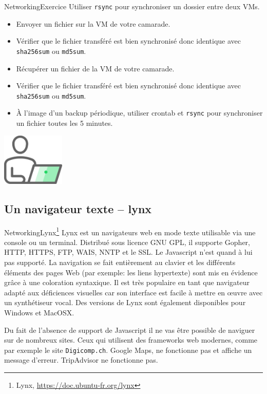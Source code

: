 \documentclass{beamer}
\begin{document}
    \begin{frame}{Networking}{Exercice \execcounterdispinc}
        Utiliser \lstinline{rsync} pour synchroniser un dossier entre deux VMs.
        \begin{itemize}
            \item Envoyer un fichier sur la VM de votre camarade.
            \item Vérifier que le fichier transféré est bien synchronisé donc identique avec \lstinline{sha256sum} ou \lstinline{md5sum}.
            \item Récupérer un fichier de la VM de votre camarade.
            \item Vérifier que le fichier transféré est bien synchronisé donc identique avec \lstinline{sha256sum} ou \lstinline{md5sum}.
            \item À l'image d'un backup périodique, utiliser crontab et \lstinline{rsync} pour synchroniser un fichier toutes les 5 minutes.
        \end{itemize}
        \begin{center}
            \includegraphics[width=3cm]{image/guy-in-front-of-desktop}
        \end{center}
    \end{frame}

    \subsection{Un navigateur texte – lynx}\label{subsec:lynx}

    \begin{frame}{Networking}{Lynx\footnote{Lynx, \url{https://doc.ubuntu-fr.org/lynx}}}
        Lynx est un navigateurs web en mode texte utilisable via une console ou un terminal.
        Distribué sous licence GNU GPL, il supporte Gopher, HTTP, HTTPS, FTP, WAIS, NNTP et le SSL. Le Javascript n'est quand à lui pas supporté.
        La navigation se fait entièrement au clavier et les différents éléments des pages Web (par exemple: les liens hypertexte) sont mis en évidence grâce à une coloration syntaxique.
        Il est très populaire en tant que navigateur adapté aux déficiences visuelles car son interface est facile à mettre en œuvre avec un synthétiseur vocal.
        Des versions de Lynx sont également disponibles pour Windows et MacOSX.
        \begin{dangercolorbox}
            Du fait de l'absence de support de Javascript il ne vas être possible de naviguer sur de nombreux sites.
            Ceux qui utilisent des frameworks web modernes, comme par exemple le site \lstinline{Digicomp.ch}.
            Google Maps, ne fonctionne pas et affiche un message d'erreur.
            TripAdvisor ne fonctionne pas.
        \end{dangercolorbox}
    \end{frame}
\end{document}
